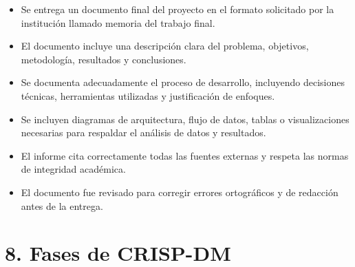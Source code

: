 \documentclass[
11pt, %
]{charter}
\begin{document}
\begin{itemize}
\begin{itemize}
    \begin{itemize}
      \item Se entrega un documento final del proyecto en el formato solicitado por la institución llamado memoria del trabajo final.

      \item El documento incluye una descripción clara del problema, objetivos, metodología, resultados y conclusiones.

      \item Se documenta adecuadamente el proceso de desarrollo, incluyendo decisiones técnicas, herramientas utilizadas y justificación de enfoques.

      \item Se incluyen diagramas de arquitectura, flujo de datos, tablas o visualizaciones necesarias para respaldar el análisis de datos y resultados.

      \item El informe cita correctamente todas las fuentes externas y respeta las normas de integridad académica.

      \item El documento fue revisado para corregir errores ortográficos y de redacción antes de la entrega.
    \end{itemize}      
    \end{itemize}
\end{itemize}


\section{8. Fases de CRISP-DM}
\end{document}
